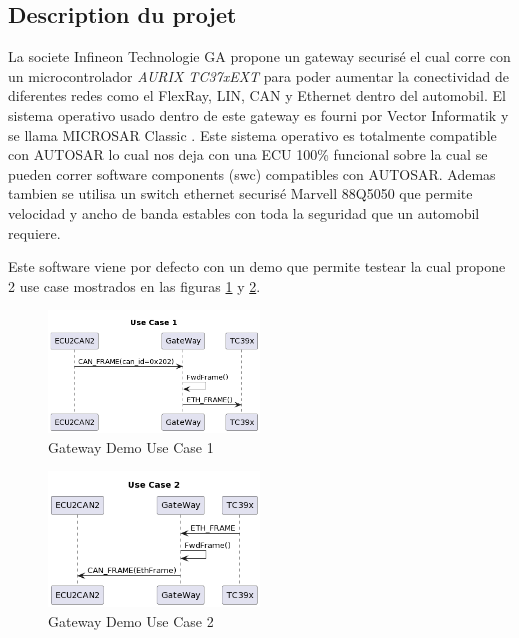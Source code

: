 \subsection{Description du projet}
La societe Infineon Technologie GA propone un gateway securis\'e \cite{gateway} el cual corre con un microcontrolador \textit{AURIX TC37xEXT} para poder aumentar la conectividad de diferentes redes como el FlexRay, LIN, CAN y Ethernet dentro del automobil. El sistema operativo usado dentro de este gateway es fourni por Vector Informatik y se llama MICROSAR Classic \cite{vector.microsar}. Este sistema operativo es totalmente compatible con AUTOSAR lo cual nos deja con una ECU 100\% funcional sobre la cual se pueden correr software components (swc) compatibles con AUTOSAR. Ademas tambien se utilisa un switch ethernet securis\'e Marvell 88Q5050 que permite velocidad y ancho de banda estables con toda la seguridad que un automobil requiere.

Este software viene por defecto con un demo que permite testear la cual propone 2 use case mostrados en las figuras \ref{fig:gw-demo-uc1} y \ref{fig:gw-demo-uc2}.

\begin{figure}[!htb]
 \centering
 \includegraphics[width=0.5\textwidth]{img/GWUseCase1.png}
 \caption{Gateway Demo Use Case 1}
 \label{fig:gw-demo-uc1}
\end{figure}

\begin{figure}[!htb]
 \centering
 \includegraphics[width=0.5\textwidth]{img/GWUseCase2.png}
 \caption{Gateway Demo Use Case 2}
 \label{fig:gw-demo-uc2}
\end{figure}

